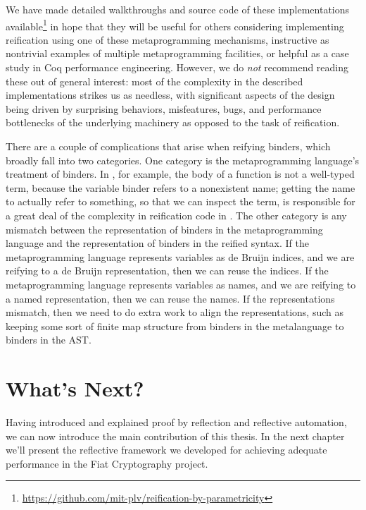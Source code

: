 We have made detailed walkthroughs and source code of these implementations available\footnote{\url{https://github.com/mit-plv/reification-by-parametricity}} in hope that they will be useful for others considering implementing reification using one of these metaprogramming mechanisms, instructive as nontrivial examples of multiple metaprogramming facilities, or helpful as a case study in Coq performance engineering.
However, we do \emph{not} recommend reading these out of general interest:
most of the complexity in the described implementations strikes us as needless,
with significant aspects of the design being driven by surprising behaviors, misfeatures, bugs, and performance bottlenecks of the underlying machinery as opposed to the task of reification.

There are a couple of complications that arise when reifying binders, which broadly fall into two categories.
One category is the metaprogramming language's treatment of binders.
In \Ltac, for example, the body of a function is not a well-typed term, because the variable binder refers to a nonexistent name; getting the name to actually refer to something, so that we can inspect the term, is responsible for a great deal of the complexity in reification code in \Ltac.
The other category is any mismatch between the representation of binders in the metaprogramming language and the representation of binders in the reified syntax.
If the metaprogramming language represents variables as de Bruijn indices, and we are reifying to a de Bruijn representation, then we can reuse the indices.
If the metaprogramming language represents variables as names, and we are reifying to a named representation, then we can reuse the names.
If the representations mismatch, then we need to do extra work to align the representations, such as keeping some sort of finite map structure from binders in the metalanguage to binders in the AST.

\section{What's Next?}

Having introduced and explained proof by reflection and reflective automation, we can now introduce the main contribution of this thesis.
In the next chapter we'll present the reflective framework we developed for achieving adequate performance in the Fiat Cryptography project.


